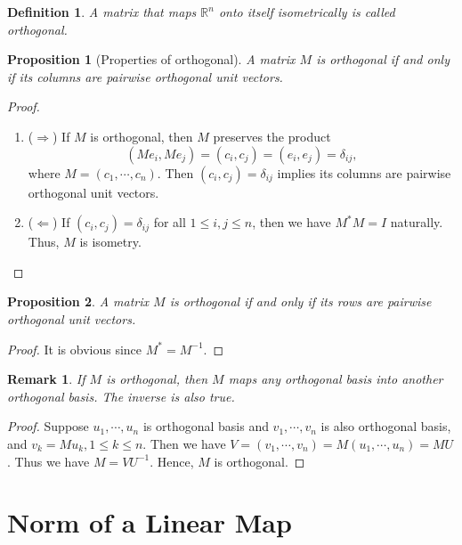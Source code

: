 \documentclass[10pt]{book}
\newtheorem{definition}{Definition}[chapter]
\newtheorem{proposition}{Proposition}[chapter]
\newtheorem{remark}{Remark}[chapter]
\theoremstyle{definition}
\numberwithin{equation}{chapter}
\begin{document}
\medskip

\begin{definition}
A matrix that maps $\mathbb{R}^n$ onto itself isometrically is called orthogonal.
\end{definition}

\medskip

\begin{proposition}[Properties of orthogonal]
A matrix $M$ is orthogonal if and only if its columns are pairwise orthogonal unit vectors.
\end{proposition}
\begin{proof}
~\begin{enumerate}[label=(\arabic*)]
    \item ($\Rightarrow$) If $M$ is orthogonal, then $M$ preserves the product $$(Me_i, Me_j) = (c_i, c_j) = (e_i,e_j) = \delta_{ij},$$ 
    where $M = (c_1,\cdots,c_n)$. Then $(c_i, c_j) = \delta_{ij}$ implies its columns are pairwise orthogonal unit vectors.
    \item ($\Leftarrow$) If $(c_i, c_j) = \delta_{ij}$ for all $1\leq i, j\leq n$, then we have $M^* M = I$ naturally. Thus, $M$ is isometry.
\end{enumerate}
\end{proof}

\medskip

\begin{proposition}
A matrix $M$ is orthogonal if and only if its rows are pairwise orthogonal unit vectors.
\end{proposition}
\begin{proof}
It is obvious since $M^* = M^{-1}$.
\end{proof}

\begin{remark}
If $M$ is orthogonal, then $M$ maps any orthogonal basis into another orthogonal basis. The inverse is also true.
\end{remark}
\begin{proof}
Suppose $u_1,\cdots,u_n$ is orthogonal basis and $v_1,\cdots,v_n$ is also orthogonal basis, and $v_k = Mu_k, 1\leq k \leq n$. Then we have
$V = (v_1,\cdots,v_n) = M (u_1,\cdots,u_n) = MU$. Thus we have $M = VU^{-1}$. Hence, $M$ is orthogonal.
\end{proof}

\medskip

\section{Norm of a Linear Map}
\end{document}
